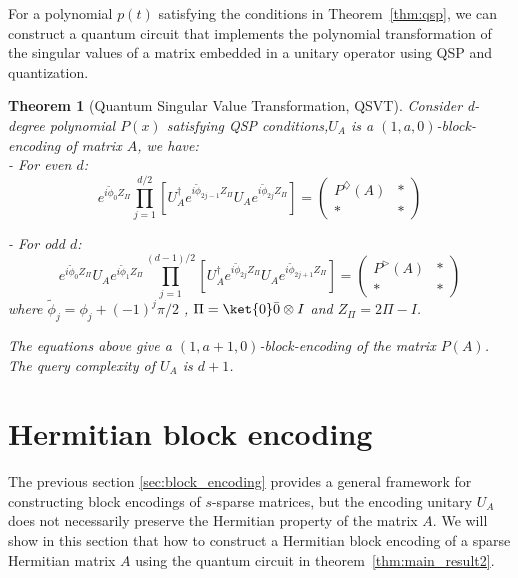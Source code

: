 \documentclass{article}
\newtheorem{theorem}{Theorem}[section]
\begin{document}
For a polynomial $p(t)$ satisfying the conditions in Theorem~\ref{thm:qsp}, we can construct a quantum circuit that implements the polynomial transformation of the singular values of a matrix embedded in a unitary operator using QSP and quantization.

\begin{theorem}[Quantum Singular Value Transformation, QSVT]
  Consider d-degree polynomial $ P(x) $ satisfying QSP conditions,$U_A$ is a $(1,a,0)$-block-encoding of matrix $A$, we have:\\
  - For even $ d $:
  \begin{equation}
    e^{i\tilde{\phi}_0 Z_\Pi} \prod_{j=1}^{d/2} \left[ U_A^\dagger e^{i\tilde{\phi}_{2j-1} Z_\Pi} U_A e^{i\tilde{\phi}_{2j} Z_\Pi} \right] =
    \begin{pmatrix}
      P^\diamondsuit(A) & * \\
      *                 & *
    \end{pmatrix}
  \end{equation}

  - For odd $ d $:
  \begin{equation}
    e^{i\tilde{\phi}_0 Z_\Pi} U_A e^{i\tilde{\phi}_1 Z_\Pi} \prod_{j=1}^{(d-1)/2} \left[ U_A^\dagger e^{i\tilde{\phi}_{2j} Z_\Pi} U_A e^{i\tilde{\phi}_{2j+1} Z_\Pi} \right] =
    \begin{pmatrix}
      P^\vartriangleright(A) & * \\
      *                      & *
    \end{pmatrix}
  \end{equation}
  where $ \tilde{\phi}_j = \phi_j + (-1)^j \pi/2 $ , $\Pi = \ket{0}\bar{0}\otimes I$ and $ Z_\Pi = 2\Pi - I $.

  The equations above give a $(1,a+1,0)$-block-encoding of the matrix $P(A)$.
  The query complexity of $U_A$ is $d+1$.

  \label{thm:qsvt}
\end{theorem}

\section{Hermitian block encoding}

The previous section \ref{sec:block_encoding} provides a general framework for constructing block encodings of $s$-sparse matrices, but the encoding unitary $U_A$ does not necessarily preserve the Hermitian property of the matrix $A$. We will show in this section that how to construct a Hermitian block encoding of a sparse Hermitian matrix $A$ using the quantum circuit in theorem~\ref{thm:main_result2}.
\end{document}
